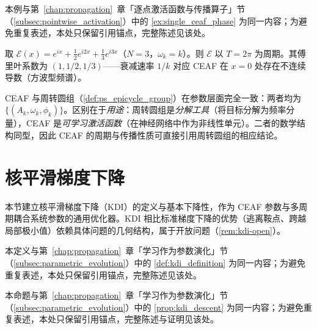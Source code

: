 \begin{example}\label{ex:single_ceaf_phase_ps}
本例与第~\ref{chap:propagation}~章「逐点激活函数与传播算子」节（\cref{subsec:pointwise_activation}）中的 \cref{ex:single_ceaf_phase} 为同一内容；为避免重复表述，本处只保留引用锚点，完整陈述见该处。
\end{example}

\begin{example}\label{ex:three_component_ceaf}
取 $\mathcal{E}(x) = e^{ix} + \frac{1}{2}e^{i2x} + \frac{1}{3}e^{i3x}$（$N=3$，$\omega_k = k$）。则 $\mathcal{E}$ 以 $T = 2\pi$ 为周期。其傅里叶系数为 $(1,1/2,1/3)$——衰减速率 $1/k$ 对应 CEAF 在 $x=0$ 处存在不连续导数（方波型频谱）。
\end{example}

\begin{remark}\label{rem:ceaf_epicycle_group}
CEAF 与周转圆组（\cref{def:ps_epicycle_group}）在参数层面完全一致：两者均为 $\{(A_k,\omega_k,\phi_k)\}$。区别在于\emph{用途}：周转圆组是\emph{分解工具}（将目标分解为频率分量），CEAF 是\emph{可学习激活函数}（在神经网络中作为非线性单元）。二者的数学结构同型，因此 CEAF 的周期与传播性质可直接引用周转圆组的相应结论。
\end{remark}

\section{核平滑梯度下降}\label{sec:ps_kdi}

\begin{remark}[本节定位]\label{rem:kdi-positioning}
本节建立核平滑梯度下降（KDI）的定义与基本下降性，作为 CEAF 参数与多周期耦合系统参数的通用优化器。KDI 相比标准梯度下降的优势（逃离鞍点、跨越局部极小值）依赖具体问题的几何结构，属于开放问题（\cref{rem:kdi-open}）。
\end{remark}

\begin{definition}\label{def:kdi_definition_ps}
本定义与第~\ref{chap:propagation}~章「学习作为参数演化」节（\cref{subsec:parametric_evolution}）中的 \cref{def:kdi_definition} 为同一内容；为避免重复表述，本处只保留引用锚点，完整陈述见该处。
\end{definition}

\begin{proposition}\label{prop:kdi_descent_ps}
本命题与第~\ref{chap:propagation}~章「学习作为参数演化」节（\cref{subsec:parametric_evolution}）中的 \cref{prop:kdi_descent} 为同一内容；为避免重复表述，本处只保留引用锚点，完整陈述与证明见该处。
\end{proposition}


